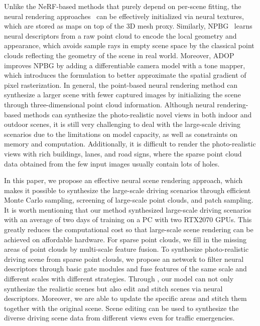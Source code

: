 \documentclass[sigconf]{acmart}
\begin{document}
 Unlike the NeRF-based methods that purely depend on per-scene fitting, the neural rendering approaches~\cite{thies2019deferred,wang2021ibutter,wu2021imitating} can be effectively initialized via neural textures, which are stored as maps on top of the 3D mesh proxy. Similarly, NPBG~\cite{aliev2020neural} learns neural descriptors from a raw point cloud to encode the local geometry and appearance, which avoids sample rays in empty scene space by the classical point clouds reflecting the geometry of the scene in real world. Moreover, ADOP~\cite{ruckert2021adop} improves NPBG by adding a differentiable camera model with a tone mapper, which introduces the formulation to better approximate the spatial gradient of pixel rasterization. In general, the point-based neural rendering method can synthesize a larger scene with fewer captured images by initializing the scene through three-dimensional point cloud information. Although neural rendering-based methods can synthesize the photo-realistic novel views in both indoor and outdoor scenes, it is still very challenging to deal with the large-scale driving scenarios due to the limitations on model capacity, as well as constraints on memory and computation. Additionally, it is difficult to render the photo-realistic views with rich buildings, lanes, and road signs, where the sparse point cloud data obtained from the few input images usually contain lots of holes.
 


In this paper, we propose an effective neural scene rendering approach, which makes it possible to synthesize the large-scale driving scenarios through efficient Monte Carlo sampling, screening of large-scale point clouds, and patch sampling. It is worth mentioning that our method synthesized large-scale driving scenarios with an average of two days of training on a PC with two RTX2070 GPUs. This greatly reduces the computational cost so that large-scale scene rendering can be achieved on affordable hardware. For sparse point clouds, we fill in the missing areas of point clouds by multi-scale feature fusion. To synthesize photo-realistic driving scene from sparse point clouds, we propose an  network to filter neural descriptors through basic gate modules and fuse features of the same scale and different scales with different strategies. Through , our model can not only synthesize the realistic scenes but also edit and stitch scenes via neural descriptors. Moreover, we are able to update the specific areas and stitch them together with the original scene. Scene editing can be used to synthesize the diverse driving scene data from different views even for traffic emergencies.
\end{document}
